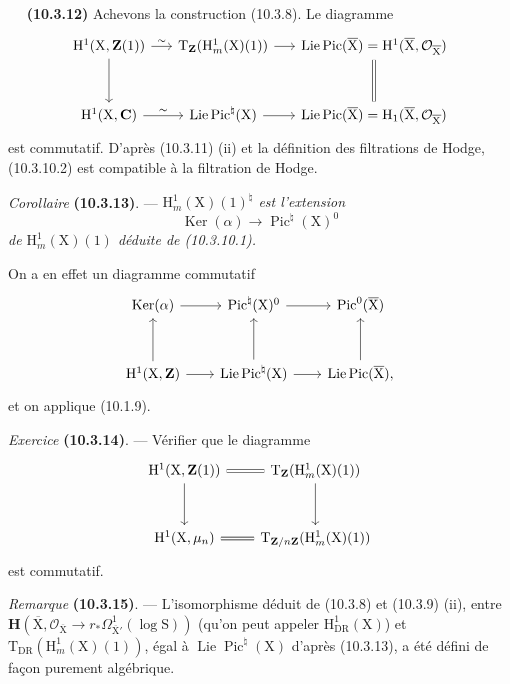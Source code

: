 \documentclass[11pt,leqno]{article}
\newcommand{\Page}[1]{\ifvmode\noindent\else\unskip\ \fi{\footnotesize\textcolor{gray}{[p.\,#1]}}\ \ignorespaces}
\begin{document}
\Page{74}
\textbf{(10.3.12)} Achevons la construction (10.3.8). Le diagramme
\[
\begin{tikzcd}[column sep=1.5em,row sep=3em]
\mathrm{H}^{1}(\mathrm{X},\mathbf{Z}(1))
 \arrow[r,"\sim"] \arrow[d]
&
\mathrm{T}_{\mathbf{Z}}(\mathrm{H}^{1}_{m}(\mathrm{X})(1))
 \arrow[r]
&
\operatorname{Lie}\operatorname{Pic}(\overline{\mathrm{X}})
 =\mathrm{H}^{1}(\overline{\mathrm{X}},\mathcal{O}_{\overline{\mathrm{X}}})
 \arrow[d,equal]
\\
\mathrm{H}^{1}(\mathrm{X},\mathbf{C})
 \arrow[r,"\sim"]
&
\operatorname{Lie}\operatorname{Pic}^{\natural}(\mathrm{X})
 \arrow[r]
&
\operatorname{Lie}\operatorname{Pic}(\overline{\mathrm{X}})
 =\mathrm{H}_{1}(\overline{\mathrm{X}},\mathcal{O}_{\overline{\mathrm{X}}})
\end{tikzcd}
\]
est commutatif. D’après (10.3.11) (ii) et la définition des filtrations de Hodge, (10.3.10.2) est compatible à la filtration de Hodge.

\textit{Corollaire} \textbf{(10.3.13)}. — \textit{\(\mathrm{H}^{1}_{m}(\mathrm{X})(1)^{\natural}\) est l’extension}
\[
\operatorname{Ker}(\alpha)\longrightarrow\operatorname{Pic}^{\natural}(\mathrm{X})^{0}
\]
\textit{de \(\mathrm{H}^{1}_{m}(\mathrm{X})(1)\) déduite de \textup{(10.3.10.1)}.}

On a en effet un diagramme commutatif
\[
\begin{tikzcd}[column sep=2em,row sep=3em]
\operatorname{Ker}(\alpha) \arrow[r]
&
\operatorname{Pic}^{\natural}(\mathrm{X})^{0} \arrow[r]
&
\operatorname{Pic}^{0}(\overline{\mathrm{X}})
\\
\mathrm{H}^{1}(\mathrm{X},\mathbf{Z}) \arrow[r] \arrow[u]
&
\operatorname{Lie}\operatorname{Pic}^{\natural}(\mathrm{X})
 \arrow[r] \arrow[u]
&
\operatorname{Lie}\operatorname{Pic}(\overline{\mathrm{X}}), \arrow[u]
\end{tikzcd}
\]
et on applique (10.1.9).

\textit{Exercice} \textbf{(10.3.14)}. — Vérifier que le diagramme
\[
\begin{tikzcd}[column sep=2em,row sep=3em]
\mathrm{H}^{1}(\mathrm{X},\mathbf{Z}(1))
 \arrow[r,equal] \arrow[d]
&
\mathrm{T}_{\mathbf{Z}}(\mathrm{H}^{1}_{m}(\mathrm{X})(1))
 \arrow[d]
\\
\mathrm{H}^{1}(\mathrm{X},\mu_n) \arrow[r,equal]
&
\mathrm{T}_{\mathbf{Z}/n\mathbf{Z}}(\mathrm{H}^{1}_{m}(\mathrm{X})(1))
\end{tikzcd}
\]
est commutatif.

\textit{Remarque} \textbf{(10.3.15)}. — L’isomorphisme déduit de (10.3.8) et (10.3.9) (ii), entre \(\mathbf{H}(\overline{\mathrm{X}},\mathcal{O}_{\overline{\mathrm{X}}}\to r_*\Omega^{1}_{\overline{\mathrm{X}}'}(\log\mathrm{S}))\) (qu’on peut appeler \(\mathrm{H}^{1}_{\mathrm{DR}}(\mathrm{X})\)) et \(\mathrm{T}_{\mathrm{DR}}(\mathrm{H}^{1}_{m}(\mathrm{X})(1))\), égal à \(\operatorname{Lie}\operatorname{Pic}^{\natural}(\mathrm{X})\) d’après (10.3.13), a été défini de façon purement algébrique.
\end{document}
